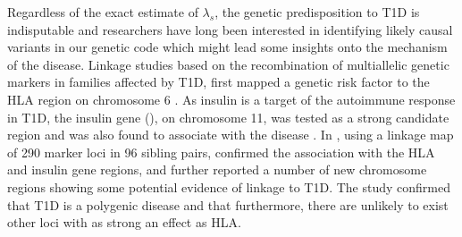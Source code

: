 


Regardless of the exact estimate of $\lambda_s$, the genetic predisposition to \gls{T1D} is indisputable
and researchers have long been interested in identifying likely causal variants in our genetic code
which might lead some insights onto the mechanism of the disease.
Linkage studies based on the recombination of multiallelic genetic markers in families affected by \gls{T1D},
first mapped a genetic risk factor to the \gls{HLA} region on chromosome 6 \citep{Singal:1973tg,Cudworth:1974ve,Nerup:1974ui}.
As insulin is a target of the autoimmune response in T1D, the insulin gene (), on chromosome 11, was tested as a strong candidate region
and was also found to associate with the disease \citep{Bell:1984uw,Permutt:1984wt}.
In \citeyear{Davies:1994gu}, \citeauthor{Davies:1994gu} using a linkage map of 290 marker loci in 96 sibling pairs,
confirmed the association with the HLA and insulin gene regions, and further 
reported a number of new chromosome regions showing some potential evidence of linkage to \gls{T1D}.
The study confirmed that \gls{T1D} is a polygenic disease and that furthermore, there are unlikely to exist other loci with as strong an effect as HLA.

